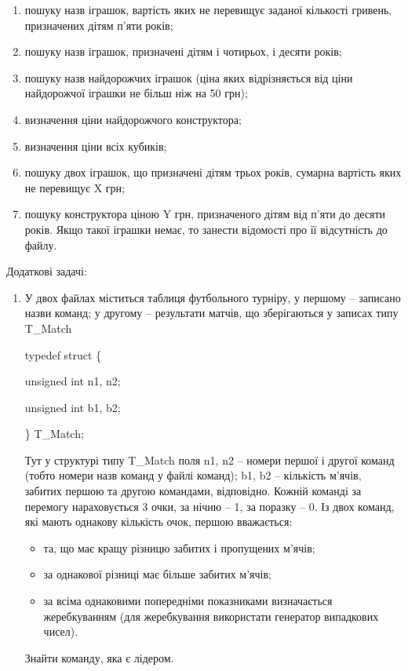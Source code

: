 \documentclass[]{article}
\makeatletter
\newcommand{\xslalph}[1]{\expandafter\@xslalph\csname c@#1\endcsname}
\newcommand{\@xslalph}[1]{%
    \ifcase#1\or а\or б\or в\or г\or д\or e\or є\or ж\or з\or i%
    \or й\or к\or л\or м\or н\or о\or п\or р\or с\or т%
    \or у\or ф\or х\or ц\or ч\or ш\or ю\or я\or аа\or бб\or вв%
    \else\@ctrerr\fi%
}
\makeatother
\begin{document}
\begin{enumerate}
\begin{enumerate}[label=\xslalph*)]
\begin{enumerate}
\begin{enumerate}[label=\xslalph*)]
\begin{enumerate}
  \begin{enumerate}[label=\xslalph*)]
\item
пошуку назв іграшок, вартість яких не перевищує заданої кількості гривень,
 призначених дітям п'яти років;
\item
пошуку назв іграшок, призначені дітям і чотирьох, і десяти років;
\item
пошуку назв найдорожчих іграшок (ціна яких відрізняється від ціни
найдорожчої іграшки не більш ніж на 50 грн);
\item визначення ціни найдорожчого конструктора;
\item визначення ціни всіх кубиків;
\item пошуку двох іграшок, що призначені дітям трьох років, сумарна
вартість яких не перевищує X грн;
\item
пошуку конструктора ціною Y грн, призначеного дітям від п'яти до
десяти років. Якщо такої іграшки немає, то занести відомості про її
відсутність до файлу.
  \end{enumerate} 


\end{enumerate}

Додаткові задачі:

\begin{enumerate}
\def\labelenumi{\arabic{enumi})}
\setcounter{enumi}{12}
\item
  У двох файлах міститься таблиця футбольного турніру, у першому --
  записано назви команд; у другому -- результати матчів, що зберігаються
  у записах типу T\_Match


typedef struct \{

unsigned int n1, n2;

unsigned int b1, b2;

\} T\_Match;

Тут у структурі типу T\_Match поля n1, n2 -- номери першої і другої 
команд (тобто номери назв команд у файлі команд); b1, b2 -- кількість
м'ячів, забитих першою та другою командами, відповідно.
Кожній команді за перемогу нараховується 3 очки, за нічию -- 1, за
поразку -- 0.
Із двох команд, які мають однакову кількість очок, першою вважається:
\begin{itemize}
\item
та, що має кращу різницю забитих і пропущених м'ячів;
\item
за однакової різниці має більше забитих м'ячів;
\item
за всіма однаковими попередніми показниками визначається жеребкуванням
(для жеребкування використати генератор випадкових чисел).
\end{itemize}
Знайти команду, яка є лідером.


\end{enumerate}
\end{enumerate}
\end{enumerate}
\end{enumerate}
\end{enumerate}
\end{document}
